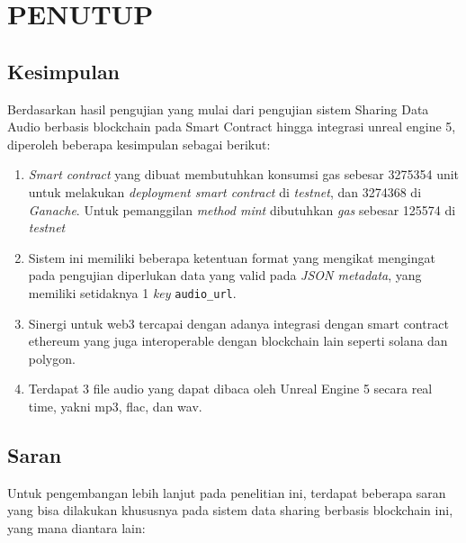 \chapter{PENUTUP}
\label{chap:penutup}


\section{Kesimpulan}
\label{sec:kesimpulan}

Berdasarkan hasil pengujian yang mulai dari pengujian sistem Sharing Data Audio berbasis blockchain pada Smart Contract hingga integrasi unreal engine 5, diperoleh beberapa kesimpulan sebagai berikut:

\begin{enumerate}[nolistsep]

  \item \emph{Smart contract} yang dibuat membutuhkan konsumsi gas sebesar 3275354 unit untuk melakukan \emph{deployment smart contract} di \emph{testnet}, dan 3274368 di \emph{Ganache}. Untuk pemanggilan \emph{method mint} dibutuhkan \emph{gas} sebesar 125574 di \emph{testnet}

  \item Sistem ini memiliki beberapa ketentuan format yang mengikat mengingat pada pengujian diperlukan data yang valid pada \emph{JSON metadata}, yang memiliki setidaknya 1 \emph{key} \texttt{audio\_url}.

  \item Sinergi untuk web3 tercapai dengan adanya integrasi dengan smart contract ethereum yang juga interoperable dengan blockchain lain seperti solana dan polygon.

  \item Terdapat 3 file audio yang dapat dibaca oleh Unreal Engine 5 secara real time, yakni mp3, flac, dan wav.

\end{enumerate}

\section{Saran}
\label{chap:saran}

Untuk pengembangan lebih lanjut pada penelitian ini, terdapat beberapa saran yang bisa dilakukan khususnya pada sistem data sharing berbasis blockchain ini, yang mana diantara lain:

